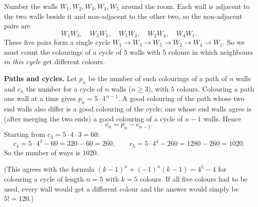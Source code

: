 Number the walls $W_1,W_2,W_3,W_4,W_5$ around the room. Each wall is adjacent to the two walls beside it and non-adjacent to the other two, so the non-adjacent pairs are
\[
W_1W_3,\quad W_3W_5,\quad W_5W_2,\quad W_2W_4,\quad W_4W_1 .
\]
These five pairs form a single cycle $W_1\to W_3\to W_5\to W_2\to W_4\to W_1$. So we must count the colourings of a cycle of $5$ walls with $5$ colours in which neighbours \emph{in this cycle} get different colours.

\textbf{Paths and cycles.} Let $p_n$ be the number of such colourings of a path of $n$ walls and $c_n$ the number for a cycle of $n$ walls ($n\ge3$), with $5$ colours. Colouring a path one wall at a time gives $p_n=5\cdot4^{\,n-1}$. A good colouring of the path whose two end walls also differ is a good colouring of the cycle; one whose end walls agree is (after merging the two ends) a good colouring of a cycle of $n-1$ walls. Hence
\[
c_n=p_n-c_{n-1}.
\]
Starting from $c_3=5\cdot4\cdot3=60$:
\[
c_4=5\cdot4^3-60=320-60=260,\qquad c_5=5\cdot4^4-260=1280-260=1020 .
\]
So the number of ways is $\boxed{1020}$.

(This agrees with the formula $(k-1)^n+(-1)^n(k-1)=4^5-4$ for colouring a cycle of length $n=5$ with $k=5$ colours. If all five colours had to be used, every wall would get a different colour and the answer would simply be $5!=120$.)
